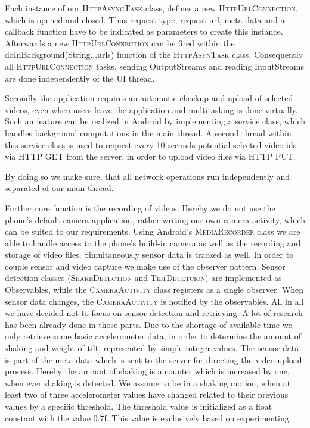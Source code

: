 \documentclass[conference]{IEEEtran}
\begin{document}
Each instance of our \textsc{HttpAsyncTask} class, defines a new \textsc{HttpUrlConnection}, which is opened and closed.
Thus request type, request url, meta data and a callback function have to be indicated as parameters to create this instance.
Afterwards a new \textsc{HttpUrlConnection} can be fired within the doInBackground(String...urls) function of the \textsc{HttpAsynTask} class. Consequently all \textsc{HttpUrlConnection} tasks,
sending OutputStreams and reading InputStreams are done independently of the UI thread.

Secondly the application requires an automatic checkup and upload of selected videos, even when users leave the application and multitasking 
is done virtually. Such an feature can be realized in Android by implementing a service class, which handles background computations in the main 
thread. A second thread within this service class is used to request  every 10 seconds potential selected video ids via HTTP GET from the server, in order to upload video files via HTTP PUT.

By doing so we make sure, that all network operations run independently and separated of our main thread.

Further core function is the recording of videos. Hereby we do not use the phone's default camera application,
rather writing our own camera activity, which can be suited to our requirements.
Using Android's \textsc{MediaRecorder} class we are able to handle access to the phone's build-in camera
as well as the recording and storage of video files.
Simultaneously sensor data is tracked as well.
In order to couple sensor and video capture we make use of the observer pattern.
Sensor detection classes (\textsc{ShakeDetection} and T\textsc{iltDetetcion}) are implemented as Observables,
while the \textsc{CameraActivity} class registers as a single observer. 
When sensor data changes, the \textsc{CameraActivity} is notified by the observables.
All in all we have decided not to focus on sensor detection and retrieving.
A lot of research has been already done in those parts. Due to the shortage of available time we only retrieve 
some basic accelerometer data, in order to determine the amount of shaking and weight of tilt, 
represented by simple integer values.
The sensor data is part of the meta data which is sent to the server for directing the video upload process.
Hereby the amount of shaking is a counter which is increased by one, when ever shaking is detected.
We assume to be in a shaking motion, when at least two of three accelerometer values have changed related
to their previous values by a specific threshold.
The threshold value is initialized as a float constant with the value 0.7f. This value is exclusively based on experimenting.
\end{document}
